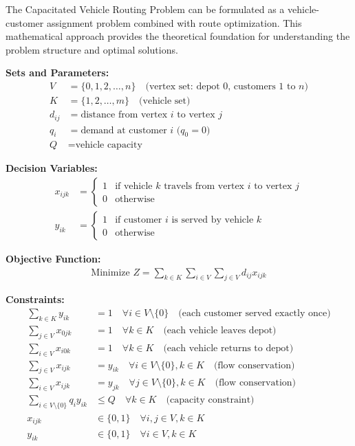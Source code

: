 \documentclass{article}
\begin{document}
The Capacitated Vehicle Routing Problem can be formulated as a vehicle-customer assignment problem combined with route optimization. This mathematical approach provides the theoretical foundation for understanding the problem structure and optimal solutions.

\textbf{Sets and Parameters:}
\begin{align}
V &= \{0, 1, 2, \ldots, n\} \quad \text{(vertex set: depot 0, customers 1 to } n\text{)} \\
K &= \{1, 2, \ldots, m\} \quad \text{(vehicle set)} \\
d_{ij} &= \text{distance from vertex } i \text{ to vertex } j \\
q_i &= \text{demand at customer } i \text{ (}q_0 = 0\text{)} \\
Q &= \text{vehicle capacity}
\end{align}

\textbf{Decision Variables:}
\begin{align}
x_{ijk} &= \begin{cases} 
1 & \text{if vehicle } k \text{ travels from vertex } i \text{ to vertex } j \\
0 & \text{otherwise}
\end{cases} \\
y_{ik} &= \begin{cases}
1 & \text{if customer } i \text{ is served by vehicle } k \\
0 & \text{otherwise}
\end{cases}
\end{align}

\textbf{Objective Function:}
\begin{align}
\text{Minimize } Z = \sum_{k \in K} \sum_{i \in V} \sum_{j \in V} d_{ij} x_{ijk}
\end{align}

\textbf{Constraints:}
\begin{align}
\sum_{k \in K} y_{ik} &= 1 \quad \forall i \in V \setminus \{0\} \quad \text{(each customer served exactly once)} \\
\sum_{j \in V} x_{0jk} &= 1 \quad \forall k \in K \quad \text{(each vehicle leaves depot)} \\
\sum_{i \in V} x_{i0k} &= 1 \quad \forall k \in K \quad \text{(each vehicle returns to depot)} \\
\sum_{j \in V} x_{ijk} &= y_{ik} \quad \forall i \in V \setminus \{0\}, k \in K \quad \text{(flow conservation)} \\
\sum_{i \in V} x_{ijk} &= y_{jk} \quad \forall j \in V \setminus \{0\}, k \in K \quad \text{(flow conservation)} \\
\sum_{i \in V \setminus \{0\}} q_i y_{ik} &\leq Q \quad \forall k \in K \quad \text{(capacity constraint)} \\
x_{ijk} &\in \{0, 1\} \quad \forall i, j \in V, k \in K \\
y_{ik} &\in \{0, 1\} \quad \forall i \in V, k \in K
\end{align}
\end{document}
